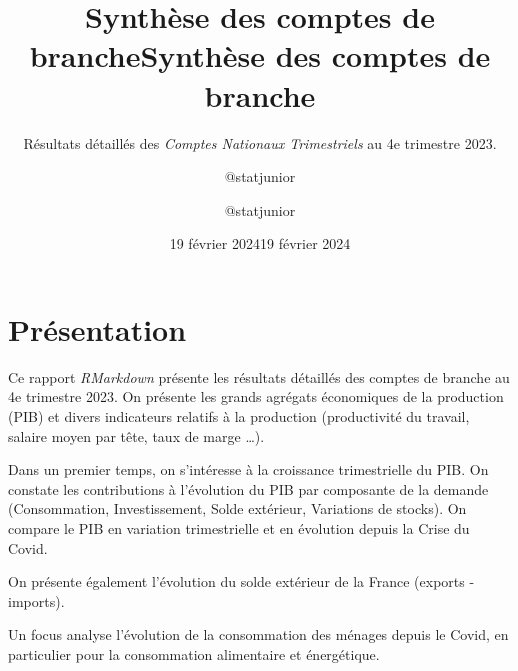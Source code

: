 \documentclass[
  paper=a4,
  ,captions=tableheading
]{scrartcl}
\title{Synthèse des comptes de branche}
\subtitle{Résultats détaillés des \emph{Comptes Nationaux Trimestriels}
au 4e trimestre 2023.}
\author{@statjunior}
\date{19 février 2024}
\title{Synthèse des comptes de branche}
\author{@statjunior}
\date{19 février 2024}
\begin{document}
\begin{titlepage}
\afterpage{\restorepagecolor}
\newcommand{\colorRule}[3][black]{\textcolor[HTML]{#1}{\rule{#2}{#3}}}
\end{titlepage}
\restoregeometry
{} 




\hypertarget{pruxe9sentation}{%
\section{Présentation}\label{pruxe9sentation}}

Ce rapport \emph{RMarkdown} présente les résultats détaillés des comptes
de branche au 4e trimestre 2023. On présente les grands agrégats
économiques de la production (PIB) et divers indicateurs relatifs à la
production (productivité du travail, salaire moyen par tête, taux de
marge \ldots).

Dans un premier temps, on s'intéresse à la croissance trimestrielle du
PIB. On constate les contributions à l'évolution du PIB par composante
de la demande (Consommation, Investissement, Solde extérieur, Variations
de stocks). On compare le PIB en variation trimestrielle et en évolution
depuis la Crise du Covid.

On présente également l'évolution du solde extérieur de la France
(exports - imports).

Un focus analyse l'évolution de la consommation des ménages depuis le
Covid, en particulier pour la consommation alimentaire et énergétique.
\end{document}
